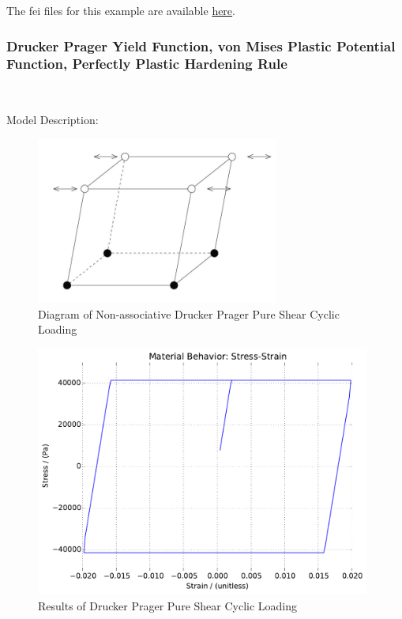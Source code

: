 \documentclass[fleqn,11pt]{article}
\begin{document}
The fei files for this example are available \href{https://github.com/yuan-energy/education_examples/tree/master/fei_examples/kinematic_hardening_pure_shear_solid/2pure_shear_cyclic_loading}{here}.

\newpage
\subsubsection{Drucker Prager Yield Function, von Mises Plastic Potential Function, Perfectly Plastic Hardening Rule} ~

Model Description:

\begin{figure}[H]
\begin{center}
\includegraphics[width=8cm]{../Figure-files/shear_cyclic_brick.JPG}
\caption{
\label{Diagram Non-associative Drucker Prager Pure Shear Cyclic Loadin}
Diagram of Non-associative Drucker Prager Pure Shear Cyclic Loading}
\end{center}
\end{figure}


\begin{figure}[H]
\begin{center}
\includegraphics[width=11cm]{../fei_examples/Drucker_Prager_Non_associate_Flow_Solid/2pure_shear_cyclic_loading/result.pdf}
\caption{
\label{Results of Drucker Prager Pure Shear Cyclic Loadin}
Results of Drucker Prager Pure Shear Cyclic Loading}
\end{center}
\end{figure}
\end{document}
